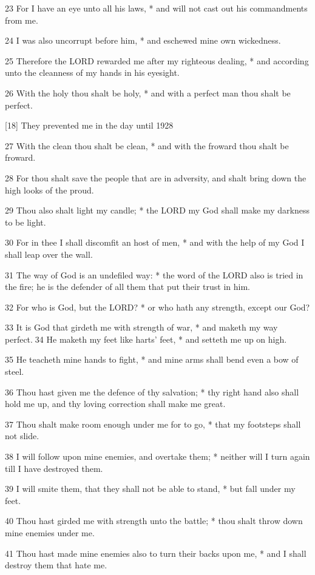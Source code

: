 23 For I have an eye unto all his laws, * and will
not cast out his commandments from me.

24 I was also uncorrupt before him, * and eschewed
mine own wickedness.

25 Therefore the LORD rewarded
me after my righteous dealing, * and according unto the cleanness of my
hands in his eyesight.

26 With the holy thou shalt be holy, * and with a perfect
man thou shalt be perfect.

[18] They prevented me in
the day until
1928

27 With the clean thou shalt be clean, * and with the
froward thou shalt be froward.

28 For thou shalt save the people that are in adversity,
and shalt bring down the high looks of the proud.

29 Thou also shalt light my candle; * the LORD
my God shall make my darkness to be light.

30 For in thee I shall discomfit an host of men, *
and with the help of my God I shall leap over the wall.

31 The way of God is an undefiled way: * the word of
the LORD also is tried in the fire; he is the defender
of all them that put their trust in him.

32 For who is God, but the LORD?
* or who hath any strength, except our God?

33 It is God that girdeth me with strength of war,
* and maketh my way perfect.34 He maketh my feet like harts' feet, *
and setteth me up on high.

35 He teacheth mine hands to fight, * and mine arms
shall bend even a bow of steel.

36
Thou hast given me the defence of thy salvation; * thy right hand also
shall hold me up, and thy loving correction shall make me great.

37 Thou shalt make room enough under me for to go,
* that my footsteps shall not slide.

38 I will follow upon mine enemies, and overtake them;
* neither will I turn again till I have destroyed them.

39 I will smite them, that they shall not be able to
stand, * but fall under my feet.

40 Thou hast girded me with strength unto the battle;
* thou shalt throw down mine enemies under me.

41 Thou hast made mine enemies also to turn their backs
upon me, * and I shall destroy them that hate me.

